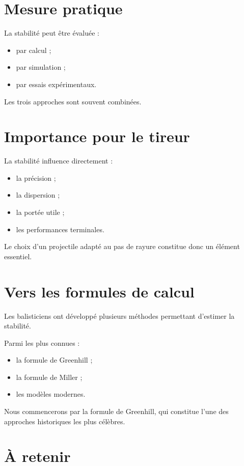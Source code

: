 \section{Mesure pratique}

La stabilité peut être évaluée :

\begin{itemize}
    \item par calcul ;
    \item par simulation ;
    \item par essais expérimentaux.
\end{itemize}

Les trois approches sont souvent combinées.

\section{Importance pour le tireur}

La stabilité influence directement :

\begin{itemize}
    \item la précision ;
    \item la dispersion ;
    \item la portée utile ;
    \item les performances terminales.
\end{itemize}

Le choix d'un projectile adapté au pas de rayure constitue donc un élément
essentiel.

\section{Vers les formules de calcul}

Les balisticiens ont développé plusieurs méthodes permettant d'estimer la
stabilité.

Parmi les plus connues :

\begin{itemize}
    \item la formule de Greenhill ;
    \item la formule de Miller ;
    \item les modèles modernes.
\end{itemize}

Nous commencerons par la formule de Greenhill, qui constitue l'une des
approches historiques les plus célèbres.

\section{À retenir}

